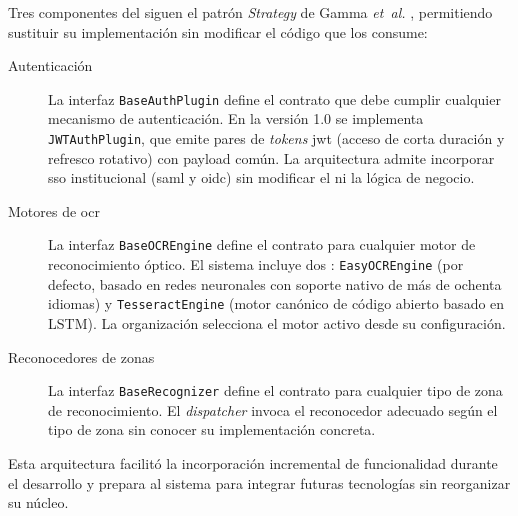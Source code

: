 Tres componentes del  siguen el patrón \textit{Strategy} de
Gamma \textit{et~al.} \cite{gof1994designpatterns}, permitiendo sustituir
su implementación sin modificar el código que los consume:

\begin{description}
  \item[Autenticación] La interfaz \texttt{BaseAuthPlugin} define el
  contrato que debe cumplir cualquier mecanismo de autenticación. En la
  versión 1.0 se implementa \texttt{JWTAuthPlugin}, que emite pares de
  \textit{tokens} \acs{jwt} (acceso de corta duración y refresco rotativo)
  con payload común. La arquitectura admite incorporar \acs{sso}
  institucional (\acs{saml} y \acs{oidc}) sin modificar el
   ni la lógica de negocio.

  \item[Motores de \acs{ocr}] La interfaz \texttt{BaseOCREngine} define el
  contrato para cualquier motor de reconocimiento óptico. El sistema
  incluye dos : \texttt{EasyOCREngine} (por defecto, basado
  en redes neuronales con soporte nativo de más de ochenta idiomas) y
  \texttt{TesseractEngine} (motor canónico de código abierto basado en
  LSTM). La organización selecciona el motor activo desde su
  configuración.

  \item[Reconocedores de zonas] La interfaz \texttt{BaseRecognizer}
  define el contrato para cualquier tipo de zona de reconocimiento. El
  \textit{dispatcher} invoca el reconocedor adecuado según el tipo de
  zona sin conocer su implementación concreta.
\end{description}

Esta arquitectura facilitó la incorporación incremental de funcionalidad
durante el desarrollo y prepara al sistema para integrar futuras
tecnologías sin reorganizar su núcleo.
